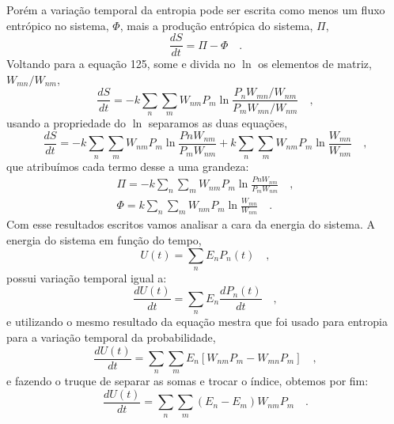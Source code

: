 \documentclass[12pt]{article}
\begin{document}
Porém a variação temporal da entropia pode ser escrita como menos um fluxo entrópico no sistema, $\Phi$, mais a produção entrópica do sistema, $\Pi$,
\begin{equation}
\frac{dS}{dt} = \Pi - \Phi \quad.
\end{equation}
Voltando para a equação 125, some e divida no $\ln$ os elementos de matriz, $W_{mn}/W_{nm}$, 
\begin{equation}
\frac{dS}{dt} = -k \sum_n\sum_m W_{nm}P_m\ln\frac{P_n W_{mn}/W_{nm}}{P_mW_{mn}/W_{nm}} \quad,
\end{equation}
usando a propriedade do $\ln$ separamos as duas equações,
\begin{equation}
\frac{dS}{dt} = -k \sum_n\sum_m W_{nm}P_m\ln \frac{PnW_{nm}}{P_mW_{nm}} + k \sum_n\sum_m W_{nm}P_m\ln \frac{W_{mn}}{W_{nm}} \quad,
\end{equation}
que atribuímos cada termo desse a uma grandeza:
\begin{align}
\Pi = -k \sum_n\sum_m W_{nm}P_m\ln \frac{PnW_{nm}}{P_mW_{nm}} \quad ,\\
\Phi = k \sum_n\sum_m W_{nm}P_m\ln \frac{W_{mn}}{W_{nm}} \quad .
\end{align}
Com esse resultados escritos vamos analisar a cara da energia do sistema. A energia do sistema em função do tempo,
\begin{equation}
U(t) = \sum_n E_n P_n(t) \quad,
\end{equation}
possui variação temporal igual a:
\begin{equation}
\frac{dU(t)}{dt} = \sum_n E_n \frac{dP_n(t)}{dt} \quad,
\end{equation}
e utilizando o mesmo resultado da equação mestra que foi usado para entropia para a variação temporal da probabilidade,
\begin{equation}
\frac{dU(t)}{dt} = \sum_n\sum_m E_n\left[W_{nm}P_m - W_{mn}P_m\right] \quad,
\end{equation}
e fazendo o truque de separar as somas e trocar o índice, obtemos por fim:
\begin{equation}
\frac{d U(t)}{dt} = \sum_n\sum_m (E_n - E_m) W_{nm}P_m \quad. 
\end{equation}
\end{document}
